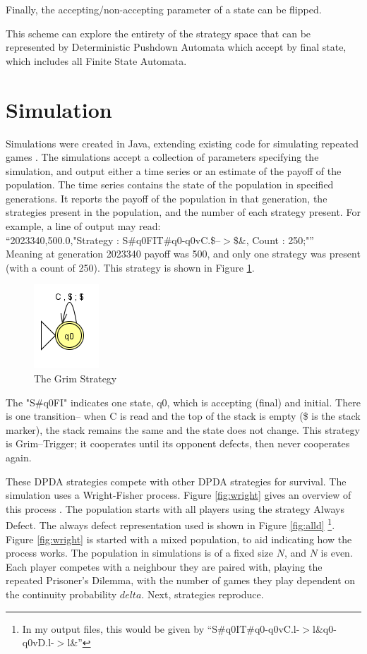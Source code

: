 \documentclass[a4paper,11pt,bcshonoursthesis,singlespace,twoside,thesisdraft,pdflatex]{cssethesis}
\begin{document}
Finally, the accepting/non-accepting parameter of a state can be flipped.

This scheme can explore the entirety of the strategy space that can be represented by Deterministic Pushdown Automata which accept by final state, which includes all Finite State Automata.
\section{Simulation}
Simulations were created in Java, extending existing code for simulating repeated games \citep{jggit}. 
The simulations accept a collection of parameters specifying the simulation, and output either a time series or an estimate of the payoff of the population. 
The time series contains the state of the population in specified generations. 
It reports the payoff of the population in that generation, the strategies present in the population, and the number of each strategy present. For example, a line of output may read:\\
``2023340,500.0,"Strategy : S\#q0FIT\#q0-q0vC.\$--$>$\$\&, Count : 250;"''\\
Meaning at generation 2023340 payoff was 500, and only one strategy was present (with a count of 250). 
This strategy is shown in Figure \ref{fig:grim}. 

\begin{figure}[h]
\centering
\includegraphics{grim}
\caption{The Grim Strategy}
\label{fig:grim}
\end{figure}

The "S\#q0FI" indicates one state, q0, which is accepting (final) and initial. 
There is one transition-- when C is read and the top of the stack is empty (\$ is the stack marker), the stack remains the same and the state does not change. 
This strategy is Grim--Trigger; it cooperates until its opponent defects, then never cooperates again. 

These DPDA strategies compete with other DPDA strategies for survival. 
The simulation uses a Wright-Fisher process. Figure \ref{fig:wright} gives an overview of this process . 
The population starts with all players using the strategy Always Defect. The always defect representation used is shown in Figure \ref{fig:alld} \footnote{In my output files, this would be given by ``S\#q0IT\#q0-q0vC.l-$>$l\&q0-q0vD.l-$>$l\&''}. 
Figure \ref{fig:wright} is started with a mixed population, to aid indicating how the process works. 
The population in simulations is of a fixed size $N$, and $N$ is even. 
Each player competes with a neighbour they are paired with, playing the repeated Prisoner's Dilemma, with the number of games they play dependent on the continuity probability $delta$. 
Next, strategies reproduce. 
\end{document}
